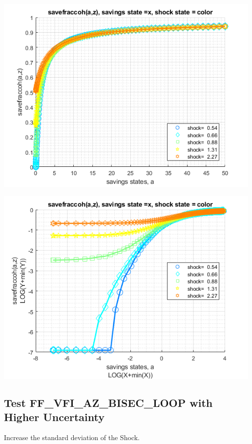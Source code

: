 \documentclass[
]{book}
\begin{document}
\includegraphics[width=5.20833in,height=\textheight]{img/fx_vfi_az_bisec_loop_images/figure_4.png}

\includegraphics[width=5.20833in,height=\textheight]{img/fx_vfi_az_bisec_loop_images/figure_5.png}

\hypertarget{test-ff_vfi_az_bisec_loop-with-higher-uncertainty}{%
\subsection{Test FF\_VFI\_AZ\_BISEC\_LOOP with Higher Uncertainty}\label{test-ff_vfi_az_bisec_loop-with-higher-uncertainty}}

Increase the standard deviation of the Shock.
\end{document}
